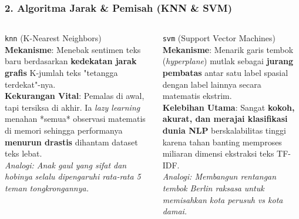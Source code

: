 \documentclass[t,aspectratio=169,xcolor=dvipsnames]{beamer}
\begin{document}
\begin{frame}
    \frametitle{2. Algoritma Jarak \& Pemisah (KNN \& SVM)}
    \scriptsize
    \begin{columns}[T]
        \begin{block}{\texttt{knn} (K-Nearest Neighbors)}
            \textbf{Mekanisme}: Menebak sentimen teks baru berdasarkan \textbf{kedekatan jarak grafis} K-jumlah teks "tetangga terdekat"-nya.\\
            \vspace{0.2cm}
            \textbf{Kekurangan Vital}: Pemalas di awal, tapi tersiksa di akhir. Ia \textit{lazy learning} menahan *semua* observasi matematis di memori sehingga performanya \textbf{menurun drastis} dihantam dataset teks lebat.\\
            \vspace{0.2cm}
            \colorbox{orange!20}{\textit{Analogi: Anak gaul yang sifat dan hobinya}}
            \colorbox{orange!20}{\textit{selalu dipengaruhi rata-rata 5 teman tongkrongannya.}}
        \end{block}

        \begin{block}{\texttt{svm} (Support Vector Machines)}
            \textbf{Mekanisme}: Menarik garis tembok (\textit{hyperplane}) mutlak sebagai \textbf{jurang pembatas} antar satu label spasial dengan label lainnya secara matematis ekstrim.\\
            \vspace{0.2cm}
            \textbf{Kelebihan Utama}: Sangat \textbf{kokoh, akurat, dan merajai klasifikasi dunia NLP} berskalabilitas tinggi karena tahan banting memproses miliaran dimensi ekstraksi teks TF-IDF.\\
            \vspace{0.2cm}
            \colorbox{nyublue!20}{\textit{Analogi: Membangun rentangan tembok Berlin raksasa}}
            \colorbox{nyublue!20}{\textit{untuk memisahkan kota perusuh vs kota damai.}}
        \end{block}
    \end{columns}
\end{frame}
\end{document}
